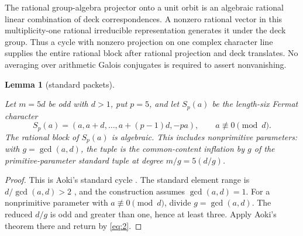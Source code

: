 \documentclass[11pt]{amsart}
\numberwithin{theorem}{section}
\newtheorem{lemma}[theorem]{Lemma}
\theoremstyle{remark}
\numberwithin{equation}{section}
\begin{document}
The rational group-algebra projector onto a unit orbit is an algebraic
rational linear combination of deck correspondences. A nonzero rational
vector in this multiplicity-one rational irreducible representation
generates it under the deck group. Thus a cycle with nonzero projection
on one complex character line supplies the entire rational block after
rational projection and deck translates. No averaging over arithmetic
Galois conjugates is required to assert nonvanishing.

\begin{lemma}[standard packets]\label{lemma:3.2}

Let \(m=5d\) be odd with \(d>1\), put \(p=5\), and let \(S_p(a)\) be the length-six Fermat character
\[
S_p(a)=(a,a+d,\ldots,a+(p-1)d,-pa),
\qquad a\not\equiv0\pmod d.
\]
The rational block of \(S_p(a)\) is algebraic. This includes nonprimitive
parameters: with \(g=\gcd(a,d)\), the tuple is the common-content
inflation by \(g\) of the primitive-parameter standard tuple at degree
\(m/g=5(d/g)\).

\end{lemma}
\begin{proof}

This is Aoki's standard cycle \cite[Theorem 2-1, p.~388]{aoki1987}. The standard
element range is \(d/\gcd(a,d)>2\) \cite[p.~387]{aoki1987}, and the construction
assumes \(\gcd(a,d)=1\). For a nonprimitive parameter with
\(a\not\equiv0\pmod d\), divide \(g=\gcd(a,d)\). The reduced
\(d/g\) is odd and greater than one, hence at least three. Apply Aoki's
theorem there and return by \eqref{eq:2}.
\end{proof}
\end{document}
